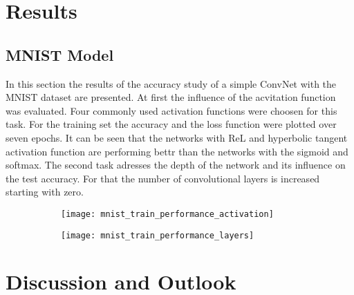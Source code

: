 \documentclass{scrreprt}
\begin{document}
\chapter{Results}
\section{MNIST Model}
In this section the results of the accuracy study of a simple ConvNet with the MNIST dataset are presented. At first the influence of the acvitation function was evaluated. Four commonly used activation functions were choosen for this task. For the training set the accuracy and the loss function were plotted over seven epochs. It can be seen that the networks with ReL and hyperbolic tangent activation function are performing bettr than the networks with the sigmoid and softmax. The second task adresses the depth of the network and its influence on the test accuracy. For that the number of convolutional layers is increased starting with zero.
\begin{figure}
	\centering
	\begin{subfigure}[H]{0.5\textwidth}
		\texttt{[image: mnist\_train\_performance\_activation]}
	\end{subfigure}%
	\hfill
	\begin{subfigure}[H]{0.5\textwidth}
		\texttt{[image: mnist\_train\_performance\_layers]}
	\end{subfigure}
\end{figure}

\chapter{Discussion and Outlook}
\end{document}
